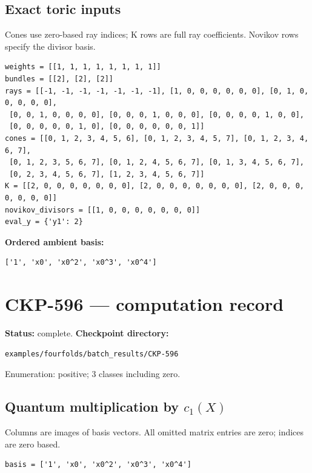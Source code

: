 \documentclass[10pt,a4paper]{article}
\begin{document}
\subsection*{Exact toric inputs}
Cones use zero-based ray indices; K rows are full ray coefficients. Novikov rows specify the divisor basis.

\begin{lstlisting}
weights = [[1, 1, 1, 1, 1, 1, 1, 1]]
bundles = [[2], [2], [2]]
rays = [[-1, -1, -1, -1, -1, -1, -1], [1, 0, 0, 0, 0, 0, 0], [0, 1, 0, 0, 0, 0, 0],
 [0, 0, 1, 0, 0, 0, 0], [0, 0, 0, 1, 0, 0, 0], [0, 0, 0, 0, 1, 0, 0],
 [0, 0, 0, 0, 0, 1, 0], [0, 0, 0, 0, 0, 0, 1]]
cones = [[0, 1, 2, 3, 4, 5, 6], [0, 1, 2, 3, 4, 5, 7], [0, 1, 2, 3, 4, 6, 7],
 [0, 1, 2, 3, 5, 6, 7], [0, 1, 2, 4, 5, 6, 7], [0, 1, 3, 4, 5, 6, 7],
 [0, 2, 3, 4, 5, 6, 7], [1, 2, 3, 4, 5, 6, 7]]
K = [[2, 0, 0, 0, 0, 0, 0, 0], [2, 0, 0, 0, 0, 0, 0, 0], [2, 0, 0, 0, 0, 0, 0, 0]]
novikov_divisors = [[1, 0, 0, 0, 0, 0, 0, 0]]
eval_y = {'y1': 2}
\end{lstlisting}

\textbf{Ordered ambient basis:}
\begin{lstlisting}
['1', 'x0', 'x0^2', 'x0^3', 'x0^4']
\end{lstlisting}

\clearpage\section*{CKP-596 --- computation record}
\textbf{Status:} complete.
\textbf{Checkpoint directory:}
\begin{lstlisting}
examples/fourfolds/batch_results/CKP-596
\end{lstlisting}

Enumeration: positive; 3 classes including zero.
\subsection*{Quantum multiplication by $c_1(X)$}
Columns are images of basis vectors. All omitted matrix entries are zero; indices are zero based.

\begin{lstlisting}
basis = ['1', 'x0', 'x0^2', 'x0^3', 'x0^4']
\end{lstlisting}
\end{document}
